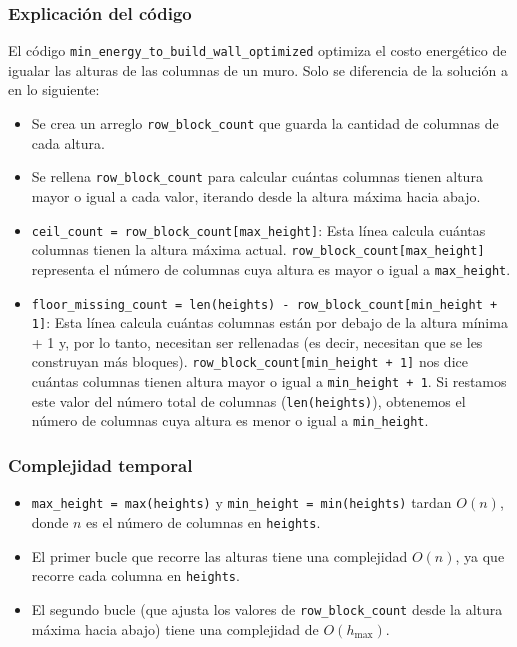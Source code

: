 \documentclass[a4paper,12pt]{article}
\begin{document}
\subsubsection{Explicación del código}

El código \texttt{min\_energy\_to\_build\_wall\_optimized} optimiza el costo energético de igualar las alturas de las columnas de un muro. Solo se diferencia de la solución a en lo siguiente:

\begin{itemize}
	\item Se crea un arreglo \texttt{row\_block\_count} que guarda la cantidad de columnas de cada altura.
	\item Se rellena \texttt{row\_block\_count} para calcular cuántas columnas tienen altura mayor o igual a cada valor, iterando desde la altura máxima hacia abajo.
	\item \texttt{ceil\_count = row\_block\_count[max\_height]}: Esta línea calcula cuántas columnas tienen la altura máxima actual. \texttt{row\_block\_count[max\_height]} representa el número de columnas cuya altura es mayor o igual a \texttt{max\_height}.
	\item \texttt{floor\_missing\_count = len(heights) - row\_block\_count[min\_height + 1]}: Esta línea calcula cuántas columnas están por debajo de la altura mínima + 1 y, por lo tanto, necesitan ser rellenadas (es decir, necesitan que se les construyan más bloques). \texttt{row\_block\_count[min\_height + 1]} nos dice cuántas columnas tienen altura mayor o igual a \texttt{min\_height + 1}. Si restamos este valor del número total de columnas (\texttt{len(heights)}), obtenemos el número de columnas cuya altura es menor o igual a \texttt{min\_height}.
\end{itemize}

\subsubsection{Complejidad temporal}

\begin{itemize}
	\item \texttt{max\_height = max(heights)} y \texttt{min\_height = min(heights)} tardan \(O(n)\), donde \(n\) es el número de columnas en \texttt{heights}.
	\item El primer bucle que recorre las alturas tiene una complejidad \(O(n)\), ya que recorre cada columna en \texttt{heights}.
	\item El segundo bucle (que ajusta los valores de \texttt{row\_block\_count} desde la altura máxima hacia abajo) tiene una complejidad de \(O(h_{\text{max}})\).
\end{itemize}
\end{document}
